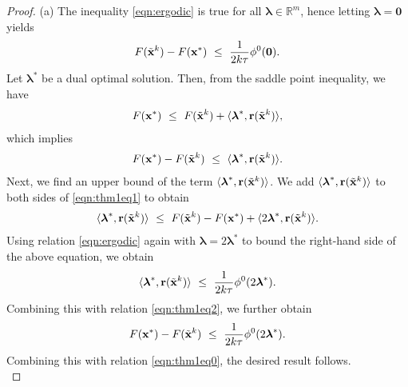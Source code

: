\documentclass[doublecolumn]{IEEEtran}
\begin{document}
\begin{proof}
\noindent (a)
The inequality \eqref{eqn:ergodic} is true for all ${\boldsymbol{\lambda}} \in \mathbb{R}^m$, hence
letting ${\boldsymbol{\lambda}} = \mathbf{0}$ yields
\begin{align}\label{eqn:thm1eq0}
 F( { \tilde{\bf x} }^k  ) - F({ {\bf x} }^*)   ~\leq~ \frac{1}{2k\tau}   \phi^0(\mathbf{0}).
\end{align}
Let ${\boldsymbol{\lambda}}^*$ be a dual optimal solution. Then, from the saddle point inequality, we have
\begin{align}\label{eqn:thm1eq1}
F({ {\bf x} }^*)  ~\leq~  F( { \tilde{\bf x} }^k  ) + \langle {\boldsymbol{\lambda}}^*, { {\bf r} }( { \tilde{\bf x} }^k  )\rangle,
\end{align}
which implies
\begin{align}\label{eqn:thm1eq2}
F({ {\bf x} }^*)  - F( { \tilde{\bf x} }^k  ) ~\leq~  \langle {\boldsymbol{\lambda}}^*, { {\bf r} }( { \tilde{\bf x} }^k  )\rangle.
\end{align}
Next, we find an upper bound of the term $\langle {\boldsymbol{\lambda}}^*, { {\bf r} }( { \tilde{\bf x} }^k  )\rangle$.
We add $\langle {\boldsymbol{\lambda}}^*, { {\bf r} }( { \tilde{\bf x} }^k  )\rangle$ to both sides of \eqref{eqn:thm1eq1} to obtain
\begin{align*}
\langle {\boldsymbol{\lambda}}^*, { {\bf r} }( { \tilde{\bf x} }^k  )\rangle  ~\leq~  F( { \tilde{\bf x} }^k  )- F({ {\bf x} }^*) + \langle 2{\boldsymbol{\lambda}}^*, { {\bf r} }( { \tilde{\bf x} }^k  )\rangle.
\end{align*}
Using relation \eqref{eqn:ergodic} again with ${\boldsymbol{\lambda}} = 2{\boldsymbol{\lambda}}^*$ to bound the right-hand side of the above equation, we obtain
\begin{align*}
\langle {\boldsymbol{\lambda}}^*, { {\bf r} }( { \tilde{\bf x} }^k  )\rangle  ~\leq~  \frac{1}{2k\tau}   \phi^0(2{\boldsymbol{\lambda}}^*).
\end{align*}
Combining this with relation \eqref{eqn:thm1eq2}, we further obtain
\begin{align*}
F({ {\bf x} }^*)  - F( { \tilde{\bf x} }^k  )  ~\leq~  \frac{1}{2k\tau}   \phi^0(2{\boldsymbol{\lambda}}^*).
\end{align*}
Combining this with relation \eqref{eqn:thm1eq0}, the desired result follows. \\


\end{proof}
\end{document}
